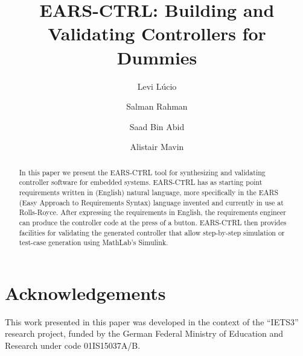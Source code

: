 \documentclass{llncs}
\begin{document}
%
\frontmatter          %

\mainmatter              %
%
\title{EARS-CTRL: Building and Validating Controllers for Dummies}
%
\titlerunning{}  %
%
\author{Levi L\'ucio \and Salman Rahman
 \and Saad Bin Abid \and Alistair Mavin}
%
\authorrunning{} %
%
\tocauthor{}
%

\maketitle              %

\begin{abstract}
In this paper we present the EARS-CTRL tool for synthesizing and 
validating controller software for embedded systems. EARS-CTRL has as starting
point requirements written in (English) natural language, more specifically in
the EARS (Easy Approach to Requirements Syntax) language invented and currently
in use at Rolls-Royce. After expressing the requirements in English, the
requirements engineer can produce the controller code at the press of a button.
EARS-CTRL then provides facilities for validating the generated controller that
allow step-by-step simulation or test-case generation using MathLab's Simulink.
\end{abstract}

 









\section*{Acknowledgements}
This work presented in this paper was developed in the context of the ``IETS3'' research project, funded by the German Federal Ministry of Education
and Research under code 01IS15037A/B.

%

%
% 


\end{document}
